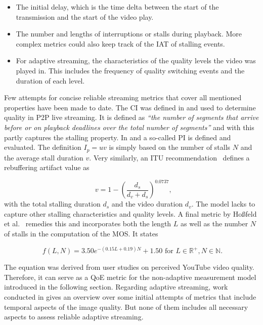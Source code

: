\begin{itemize}
	\item The initial delay, which is the time delta between the start of the transmission and the start of the video play.

	\item The number and lengths of interruptions or stalls during playback. More complex metrics could also keep track of the \acrshort{IAT} of stalling events.

	\item For adaptive streaming, the characteristics of the quality levels the video was played in. This includes the frequency of quality switching events and the duration of each level.
\end{itemize}

Few attempts for concise reliable streaming metrics that cover all mentioned properties have been made to date. The \gls{CI} was defined in \cite{1498486} and used to determine quality in \gls{P2P} live streaming. It is defined as \textit{\enquote{the number of segments that arrive before or on playback deadlines over the total number of segments}} and with this partly captures the stalling property. In \cite{5634160} and \cite{DBLP:journals/corr/SeyedebrahimiBP13} a so-called \gls{PI} is defined and evaluated. The definition $I_p = uv$ is simply based on the number of stalls $N$ and the average stall duration $v$. Very similarly, an \gls{ITU} recommendation~\cite{ituP1202.1} defines a rebuffering artifact value as 

\begin{equation}
	\phantom{,}v = 1 - {\left(\frac{d_s}{d_v + d_s}\right)}^{0.0737}\text{,}
\end{equation}
%
 with the total stalling duration $d_s$ and the video duration $d_v$. The model lacks to capture other stalling characteristics and quality levels. A final metric by Hoßfeld et al.~\cite{hossfeld2013youtubeqoe} remedies this and incorporates both the length $L$ as well as the number $N$ of stalls in the computation of the \gls{MOS}. It states

\begin{equation}
	\phantom{.} f(L,N) = 3.50e^{-(0.15L +0.19)N} + 1.50 \text{ for } L \in \mathbb{R}^{+}, N \in \mathbb{N}\text{.}
\label{c3:eqn:hossfeld-stalling-model}
\end{equation}

The equation was derived from user studies on perceived YouTube video quality. Therefore, it can serve as a \gls{QoE} metric for the non-adaptive measurement model introduced in the following section. Regarding adaptive streaming, work conducted in \cite{6603210} gives an overview over some initial attempts of metrics that include temporal aspects of the image quality. But none of them includes all necessary aspects to assess reliable adaptive streaming.

